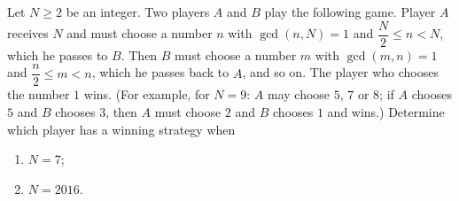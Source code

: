 Let $N\ge2$ be an integer. Two players $A$ and $B$ play the following game. Player $A$ receives $N$ and must choose a number $n$ with $\gcd(n,N)=1$ and $\dfrac {N}{2}\le n<N$, which he passes to $B$. Then $B$ must choose a number $m$ with $\gcd(m,n)=1$ and $\dfrac {n}{2}\le m<n$, which he passes back to $A$, and so on. The player who chooses the number $1$ wins. (For example, for $N=9$: $A$ may choose $5$, $7$ or $8$; if $A$ chooses $5$ and $B$ chooses $3$, then $A$ must choose $2$ and $B$ chooses $1$ and wins.) Determine which player has a winning strategy when
\begin{enumerate}
\item[(a)] $N=7$;
\item[(b)] $N=2016$.
\end{enumerate}
